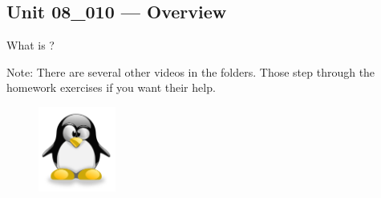 \documentclass[letterpaper,12pt]{exam}
\newcommand{\unit}{Unit 08}
\begin{document}
\begin {questions}

\section*{\unit\_010 --- Overview} %

\begin{samepage}
	\question What is ?
	\vspace{5mm}
\end{samepage}

\end{questions}

\noindent Note: There are several other videos in the folders.  Those step through the homework exercises if you want their help.

\begin{figure}[b]\label{end}
	\center
	\includegraphics[width=1in]{tux}
\end{figure}
\end{document}
